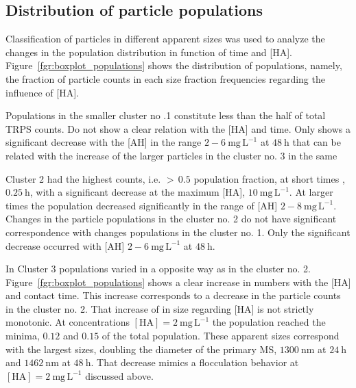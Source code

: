 \documentclass[journal=langd5,manuscript=article]{achemso}
\begin{document}
\subsection{Distribution of particle populations}

Classification of particles in different apparent sizes was used to analyze the changes in the population distribution in function of time and [HA].
Figure~\ref{fgr:boxplot_populations} shows the distribution of populations,
namely, the fraction of particle counts in each size fraction frequencies 
regarding the influence of [HA].

Populations in the smaller cluster no .1 constitute less than the half of total TRPS counts.  Do not show a clear relation with the [HA] and 
time. 
Only  shows a  significant decrease 
with the [AH] in the range $2-6~\mathrm{mg\,L^{-1}}$ 
at 
$48~\mathrm{h}$ that can be related with the increase of the larger particles in the cluster no. 3 in the same 

Cluster 2
had the highest counts, i.e.
$>\,0.5$ population fraction, 
 at short times
,$0.25~\mathrm{h}$,
with a significant decrease at the maximum [HA], 
$10~\mathrm{mg\,L^{-1}}$.
At larger times the population decreased significantly in the range
of [AH] $2-8~\mathrm{mg\,L^{-1}}$.
Changes in the particle populations in the cluster no. 2 do not have
significant correspondence  with changes populations in the cluster no. 1.
Only  the  significant decrease  occurred
with [AH] $2-6~\mathrm{mg\,L^{-1}}$ 
at 
$48~\mathrm{h}$.






In Cluster 3 
populations varied in a opposite way as in the cluster no. 2. Figure~\ref{fgr:boxplot_populations}
shows a clear increase in numbers with the [HA] and contact time.
This increase corresponds to a decrease in the particle counts in the cluster no. 2.
%
That increase of in size regarding [HA] is not strictly monotonic.
 At concentrations 
$\mathrm{[HA]} = 2~\mathrm{mg\,L^{-1}}$ 
the  population reached the  minima, $0.12$ and $0.15$ of the total population. These apparent sizes  correspond
with the largest sizes, doubling the diameter of the primary MS,  
$1300~\mathrm{nm}$ at
$24~\mathrm{h}$ 
and
$1462~\mathrm{nm}$ at
$48~\mathrm{h}$. 
That decrease mimics a flocculation behavior at 
$\mathrm{[HA]} = 2~\mathrm{mg\,L^{-1}}$ 
discussed above.
\end{document}
